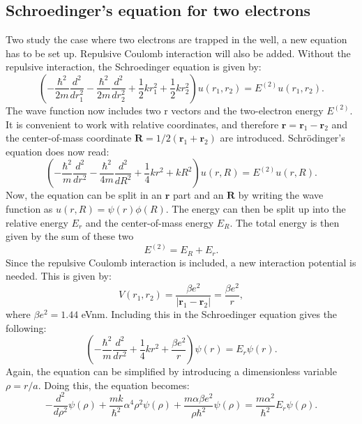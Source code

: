 \documentclass[10pt,a4paper,titlepage]{article}
\begin{document}
\subsection{Schroedinger's equation for two electrons}
Two study the case where two electrons are trapped in the well, a new equation has to be set up. Repulsive Coulomb interaction will also be added. Without the repulsive interaction, the Schroedinger equation is given by:
\begin{equation}
\label{eq:SE5}
\left(  -\frac{\hbar^2}{2 m} \frac{d^2}{dr_1^2} -\frac{\hbar^2}{2 m} \frac{d^2}{dr_2^2}+ \frac{1}{2}k r_1^2+ \frac{1}{2}k r_2^2\right)u(r_1,r_2)  = E^{(2)} u(r_1,r_2) .
\end{equation}
The wave function now includes two r vectors and the two-electron energy $E^{(2)}$. It is convenient to work with relative coordinates, and therefore $\mathbf{r} = \mathbf{r}_1-\mathbf{r}_2$
and the center-of-mass coordinate $\mathbf{R} = 1/2(\mathbf{r}_1+\mathbf{r}_2)$ are introduced. Schrödinger's equation does now read:
\begin{equation}
\left(  -\frac{\hbar^2}{m} \frac{d^2}{dr^2} -\frac{\hbar^2}{4 m} \frac{d^2}{dR^2}+ \frac{1}{4} k r^2+  kR^2\right)u(r,R)  = E^{(2)} u(r,R).
\end{equation}
Now, the equation can be split in an $\mathbf{r}$ part and an $\mathbf{R}$ by writing the wave function as $u(r,R) = \psi(r)\phi(R)$. The energy can then be split up into the relative energy $E_{r}$ and the center-of-mass energy $E_{R}$. The total energy is then given by the sum of these two
\begin{equation}
\label{eq:totE}
E^{(2)}=E_{R}+E_{r}.
\end{equation}
Since the repulsive Coulomb interaction is included, a new interaction potential is needed. This is given by:
\begin{equation}
\label{eq:pot_co}
V(r_1,r_2) = \frac{\beta e^2}{|\mathbf{r}_1-\mathbf{r}_2|}=\frac{\beta e^2}{r},
\end{equation}
where $\beta e^2=1.44$ eVnm.
Including this in the Schroedinger equation gives the following:
\begin{equation}
\left(  -\frac{\hbar^2}{m} \frac{d^2}{dr^2}+ \frac{1}{4}k r^2+\frac{\beta e^2}{r}\right)\psi(r)  = E_r \psi(r).
\end{equation}
Again, the equation can be simplified by introducing a dimensionless variable $\rho=r/a$. Doing this, the equation becomes:
\begin{equation}
-\frac{d^2}{d\rho^2} \psi(\rho)+\frac{mk}{\hbar^2} \alpha^4\rho^2\psi(\rho)+\frac{m\alpha \beta e^2}{\rho\hbar^2}\psi(\rho)=\frac{m\alpha^2}{\hbar^2}E_r \psi(\rho).
\end{equation}
\end{document}
